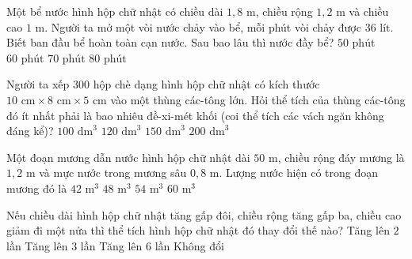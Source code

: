 \begin{ex} %
Một bể nước hình hộp chữ nhật có chiều dài $1{,}8\text{ m}$, chiều rộng $1{,}2\text{ m}$ và chiều cao $1\text{ m}$. Người ta mở một vòi nước chảy vào bể, mỗi phút vòi chảy được $36\text{ lít}$. Biết ban đầu bể hoàn toàn cạn nước. Sau bao lâu thì nước đầy bể?
\choice
{$50\text{ phút}$}
{\True $60\text{ phút}$}
{$70\text{ phút}$}
{$80\text{ phút}$}
\end{ex}

\begin{ex} %
Người ta xếp $300$ hộp chè dạng hình hộp chữ nhật có kích thước $10\text{ cm} \times 8\text{ cm} \times 5\text{ cm}$ vào một thùng các-tông lớn. Hỏi thể tích của thùng các-tông đó ít nhất phải là bao nhiêu đề-xi-mét khối (coi thể tích các vách ngăn không đáng kể)?
\choice
{$100\text{ dm}^3$}
{\True $120\text{ dm}^3$}
{$150\text{ dm}^3$}
{$200\text{ dm}^3$}
\end{ex}

\begin{ex} %
Một đoạn mương dẫn nước hình hộp chữ nhật dài $50\text{ m}$, chiều rộng đáy mương là $1{,}2\text{ m}$ và mực nước trong mương sâu $0{,}8\text{ m}$. Lượng nước hiện có trong đoạn mương đó là
\choice
{$42\text{ m}^3$}
{\True $48\text{ m}^3$}
{$54\text{ m}^3$}
{$60\text{ m}^3$}
\end{ex}

\begin{ex} %
Nếu chiều dài hình hộp chữ nhật tăng gấp đôi, chiều rộng tăng gấp ba, chiều cao giảm đi một nửa thì thể tích hình hộp chữ nhật đó thay đổi thế nào?
\choice
{Tăng lên $2$ lần}
{\True Tăng lên $3$ lần}
{Tăng lên $6$ lần}
{Không đổi}
\end{ex}


